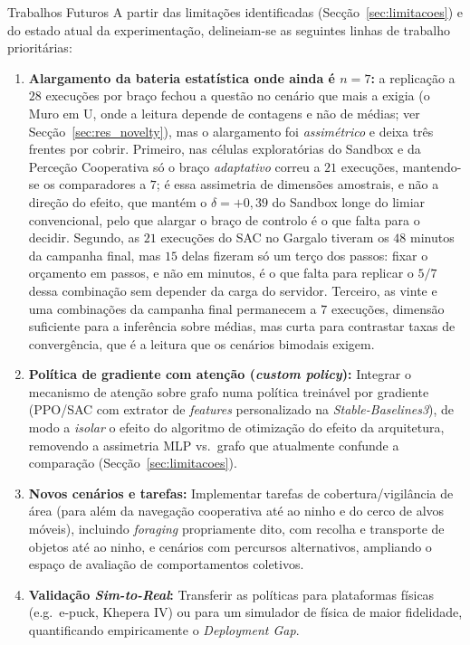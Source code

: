 \documentclass[12pt,reqno, twoside]{amsbook}
\makeatletter
\def\section{\@startsection{section}{1}%
      \z@{.5\linespacing\@plus.7\linespacing}{.25\linespacing}%
      {\normalfont\bfseries\flushleft}}
\theoremstyle{plain}
\numberwithin{equation}{chapter}
\numberwithin{section}{chapter}
\numberwithin{table}{chapter}
\numberwithin{figure}{chapter}
\makeatother
\begin{document}
\section{Trabalhos Futuros}
\label{sec:limitacoes_trabalho_futuro}
A partir das limitações identificadas (Secção~\ref{sec:limitacoes}) e do estado atual da experimentação, delineiam-se as seguintes linhas de trabalho prioritárias:
\begin{enumerate}
    \item \textbf{Alargamento da bateria estatística onde ainda é $n=7$:} a replicação a $28$ execuções por braço fechou a questão no cenário que mais a exigia (o Muro em U, onde a leitura depende de contagens e não de médias; ver Secção~\ref{sec:res_novelty}), mas o alargamento foi \emph{assimétrico} e deixa três frentes por cobrir. Primeiro, nas células exploratórias do Sandbox e da Perceção Cooperativa só o braço \emph{adaptativo} correu a $21$ execuções, mantendo-se os comparadores a $7$; é essa assimetria de dimensões amostrais, e não a direção do efeito, que mantém o $\delta = +0{,}39$ do Sandbox longe do limiar convencional, pelo que alargar o braço de controlo é o que falta para o decidir. Segundo, as $21$ execuções do SAC no Gargalo tiveram os $48$ minutos da campanha final, mas $15$ delas fizeram só um terço dos passos: fixar o orçamento em passos, e não em minutos, é o que falta para replicar o $5/7$ dessa combinação sem depender da carga do servidor. Terceiro, as vinte e uma combinações da campanha final permanecem a $7$ execuções, dimensão suficiente para a inferência sobre médias, mas curta para contrastar taxas de convergência, que é a leitura que os cenários bimodais exigem.
    \item \textbf{Política de gradiente com atenção (\textit{custom policy}):} Integrar o mecanismo de atenção sobre grafo numa política treinável por gradiente (PPO/SAC com extrator de \textit{features} personalizado na \textit{Stable-Baselines3}), de modo a \emph{isolar} o efeito do algoritmo de otimização do efeito da arquitetura, removendo a assimetria MLP vs.\ grafo que atualmente confunde a comparação (Secção~\ref{sec:limitacoes}).
    \item \textbf{Novos cenários e tarefas:} Implementar tarefas de cobertura/vigilância de área (para além da navegação cooperativa até ao ninho e do cerco de alvos móveis), incluindo \textit{foraging} propriamente dito, com recolha e transporte de objetos até ao ninho, e cenários com percursos alternativos, ampliando o espaço de avaliação de comportamentos coletivos.
    \item \textbf{Validação \textit{Sim-to-Real}:} Transferir as políticas para plataformas físicas (e.g.\ e-puck, Khepera IV) ou para um simulador de física de maior fidelidade, quantificando empiricamente o \textit{Deployment Gap}.

\end{enumerate}
\end{document}

